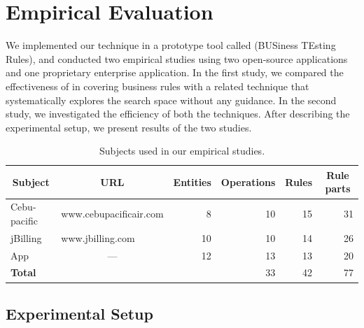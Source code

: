 \section{Empirical Evaluation}
\label{sec:eval}

We implemented our technique in a prototype tool called \tool{} (BUSiness
TEsting Rules), and conducted two empirical studies using two open-source
applications and one proprietary enterprise application. In the first study, we
compared the effectiveness of \tool{} in covering business rules with a related
technique that systematically explores the search space without any guidance. In
the second study, we investigated the efficiency of both the techniques. After
describing the experimental setup, we present results of the two studies.

\begin{table}[t]
\caption{Subjects used in our empirical studies.}
\centering
{\scriptsize
\tabcolsep=3pt
\begin{tabular}{|l|l|r|r|r|r|}
\hline
\multicolumn{1}{|c|}{Subject} & \multicolumn{1}{|c|}{URL} & \multicolumn{1}{|c|}{Entities} & \multicolumn{1}{|c|}{Operations} & \multicolumn{1}{|c|}{Rules} & \multicolumn{1}{|c|}{Rule parts} \\
\hline \hline
Cebu-pacific & www.cebupacificair.com 		& 8  & 10 & 15	 & 31 \\
jBilling 		 & www.jbilling.com 					& 10 & 10 & 14 	 & 26 \\
App 				 & \multicolumn{1}{|c|}{---}	& 12 & 13 & 13   & 20 \\
\hline \hline
\textbf{Total} & 													& 	 & 33 & 42   & 77 \\
\hline
\end{tabular}
}
\label{tab:subjects}
\end{table}


\subsection{Experimental Setup}
\label{sec:impl}
\vspace*{-3ex}
